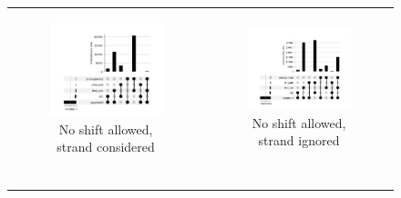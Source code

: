 \begin{figure}[ht]
    \begin{tabular}{cc}
        \begin{subfigure}{.5\textwidth}
            \centering

            \includegraphics[width=\linewidth]{chapters/4_results_and_discussion/figures/detection/upset/diff_0_strand.png}
            \caption{No shift allowed, strand considered}
            \label{fig:detection_upset_full}
        \end{subfigure}
         &
        \begin{subfigure}{.5\textwidth}
            \centering

            \includegraphics[width=\linewidth]{chapters/4_results_and_discussion/figures/detection/upset/diff_0_nostrand.png}
            \caption{No shift allowed, strand ignored}
            \label{fig:detection_upset_nostrand}
        \end{subfigure} \\
        \multicolumn{2}{c}{
            \begin{subfigure}{\textwidth}
                \centering


\end{subfigure}}
\end{tabular}
\end{figure}
